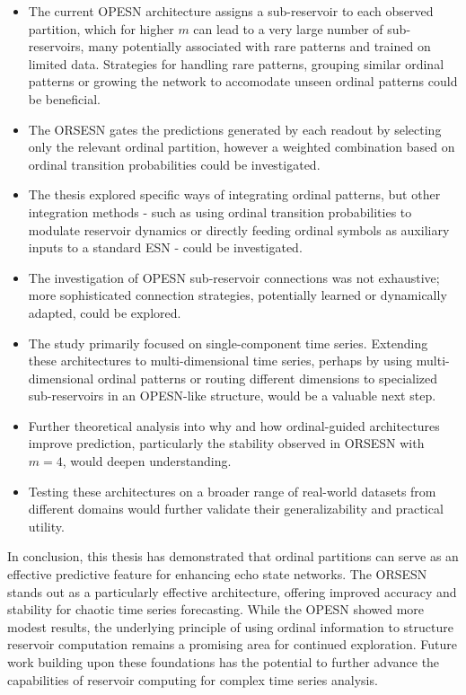 \begin{itemize}
    \item The current OPESN architecture assigns a sub-reservoir to each observed partition, which for higher $m$ can lead to a very large number of sub-reservoirs, many potentially associated with rare patterns and trained on limited data. Strategies for handling rare patterns, grouping similar ordinal patterns or growing the network to accomodate unseen ordinal patterns could be beneficial.
    \item The ORSESN gates the predictions generated by each readout by selecting only the relevant ordinal partition, however a weighted combination based on ordinal transition probabilities could be investigated.
    \item The thesis explored specific ways of integrating ordinal patterns, but other integration methods - such as using ordinal transition probabilities to modulate reservoir dynamics or directly feeding ordinal symbols as auxiliary inputs to a standard ESN - could be investigated.
    \item The investigation of OPESN sub-reservoir connections was not exhaustive; more sophisticated connection strategies, potentially learned or dynamically adapted, could be explored.
    \item The study primarily focused on single-component time series. Extending these architectures to multi-dimensional time series, perhaps by using multi-dimensional ordinal patterns or routing different dimensions to specialized sub-reservoirs in an OPESN-like structure, would be a valuable next step.
    \item Further theoretical analysis into why and how ordinal-guided architectures improve prediction, particularly the stability observed in ORSESN with $m=4$, would deepen understanding.
    \item Testing these architectures on a broader range of real-world datasets from different domains would further validate their generalizability and practical utility.
\end{itemize}

In conclusion, this thesis has demonstrated that ordinal partitions can serve as an effective predictive feature for enhancing echo state networks. The ORSESN stands out as a particularly effective architecture, offering improved accuracy and stability for chaotic time series forecasting. While the OPESN showed more modest results, the underlying principle of using ordinal information to structure reservoir computation remains a promising area for continued exploration. Future work building upon these foundations has the potential to further advance the capabilities of reservoir computing for complex time series analysis.
